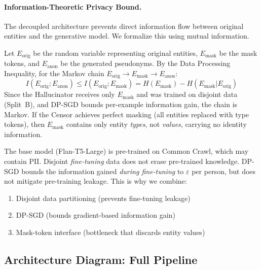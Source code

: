 \documentclass[11pt, a4paper]{article}
\newcommand{\eps}{\varepsilon}
\begin{document}
\paragraph{Information-Theoretic Privacy Bound.}
The decoupled architecture prevents direct information flow between original entities and the generative model. We formalize this using mutual information.

Let $E_{\text{orig}}$ be the random variable representing original entities, $E_{\text{mask}}$ be the mask tokens, and $E_{\text{anon}}$ be the generated pseudonyms. By the Data Processing Inequality, for the Markov chain $E_{\text{orig}} \rightarrow E_{\text{mask}} \rightarrow E_{\text{anon}}$:
\begin{equation}
I(E_{\text{orig}}; E_{\text{anon}}) \leq I(E_{\text{orig}}; E_{\text{mask}}) = H(E_{\text{mask}}) - H(E_{\text{mask}} | E_{\text{orig}})
\end{equation}
Since the Hallucinator receives only $E_{\text{mask}}$ and was trained on disjoint data (Split~B), and DP-SGD bounds per-example information gain, the chain is Markov. If the Censor achieves perfect masking (all entities replaced with type tokens), then $E_{\text{mask}}$ contains only entity \textit{types}, not \textit{values}, carrying no identity information.

\begin{warningbox}
The base model (Flan-T5-Large) is pre-trained on Common Crawl, which may contain PII. Disjoint \textit{fine-tuning} data does not erase pre-trained knowledge. DP-SGD bounds the information gained \textit{during fine-tuning} to $\eps$ per person, but does not mitigate pre-training leakage. This is why we combine:
\begin{enumerate}[nosep]
  \item Disjoint data partitioning (prevents fine-tuning leakage)
  \item DP-SGD (bounds gradient-based information gain)
  \item Mask-token interface (bottleneck that discards entity values)
\end{enumerate}
\end{warningbox}

\subsection{Architecture Diagram: Full Pipeline}
\end{document}
